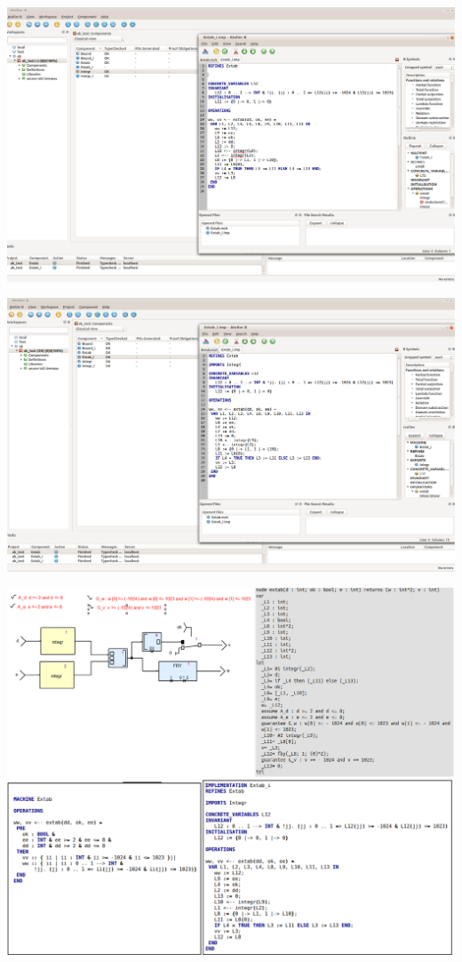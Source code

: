 \documentclass[10pt]{beamer}
\begin{document}
\begin{frame}
\includegraphics[scale=0.18]{4_integ.png}
\end{frame}
\begin{frame}
\includegraphics[scale=0.18]{5_ok.png}
\end{frame}
\begin{frame}
\includegraphics[scale=0.23]{final2.png}
\end{frame}
\end{document}
